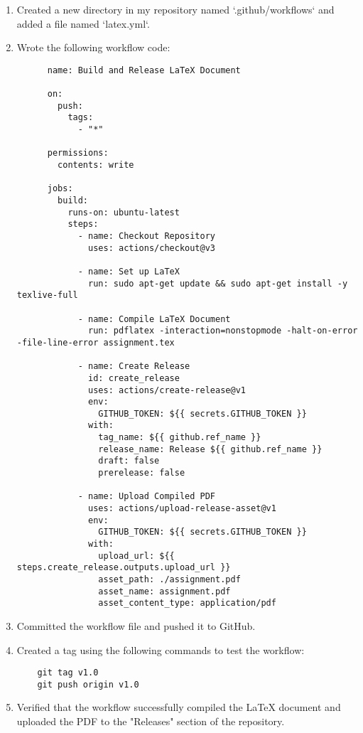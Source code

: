 \documentclass{article}
\begin{document}
\begin{enumerate}
    \item Created a new directory in my repository named `.github/workflows` and added a file named `latex.yml`.
    \item Wrote the following workflow code:
    \begin{verbatim}
      name: Build and Release LaTeX Document

      on:
        push:
          tags:
            - "*"
      
      permissions:
        contents: write
      
      jobs:
        build:
          runs-on: ubuntu-latest
          steps:
            - name: Checkout Repository
              uses: actions/checkout@v3
      
            - name: Set up LaTeX
              run: sudo apt-get update && sudo apt-get install -y texlive-full
      
            - name: Compile LaTeX Document
              run: pdflatex -interaction=nonstopmode -halt-on-error -file-line-error assignment.tex
      
            - name: Create Release
              id: create_release
              uses: actions/create-release@v1
              env:
                GITHUB_TOKEN: ${{ secrets.GITHUB_TOKEN }}
              with:
                tag_name: ${{ github.ref_name }}
                release_name: Release ${{ github.ref_name }}
                draft: false
                prerelease: false
      
            - name: Upload Compiled PDF
              uses: actions/upload-release-asset@v1
              env:
                GITHUB_TOKEN: ${{ secrets.GITHUB_TOKEN }}
              with:
                upload_url: ${{ steps.create_release.outputs.upload_url }}
                asset_path: ./assignment.pdf
                asset_name: assignment.pdf
                asset_content_type: application/pdf
    \end{verbatim}
    \item Committed the workflow file and pushed it to GitHub.
    \item Created a tag using the following commands to test the workflow:
    \begin{verbatim}
    git tag v1.0
    git push origin v1.0
    \end{verbatim}
    \item Verified that the workflow successfully compiled the LaTeX document and uploaded the PDF to the "Releases" section of the repository.
\end{enumerate}
\end{document}
